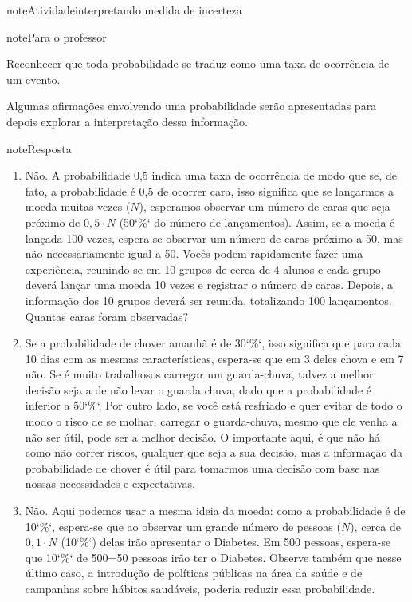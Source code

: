 \begin{sphinxadmonition}{note}{Atividade}{interpretando medida de incerteza}
\label{ativ-interpretando}

\begin{sphinxadmonition}{note}{Para o professor}

 Reconhecer que toda probabilidade se traduz como uma taxa de ocorrência de um evento.

 Algumas afirmações envolvendo uma probabilidade serão apresentadas para depois explorar a interpretação dessa informação.

\begin{sphinxadmonition}{note}{Resposta}

\begin{enumerate}
\item {} 
Não. A probabilidade 0,5 indica uma taxa de ocorrência de modo que se, de fato, a probabilidade é 0,5 de ocorrer cara, isso significa que se lançarmos a moeda muitas vezes (\(N\)), esperamos observar um número de caras que seja próximo de \(0,5\cdot N\) (50{}`\%{}` do número de lançamentos). Assim, se a moeda é lançada 100 vezes, espera-se observar um número de caras próximo a 50, mas não necessariamente igual a 50. Vocês podem rapidamente fazer uma experiência, reunindo-se em 10 grupos de cerca de 4 alunos e cada grupo deverá lançar uma moeda 10 vezes e registrar o número de caras. Depois, a informação dos 10 grupos deverá ser reunida, totalizando 100 lançamentos. Quantas caras foram observadas?

\item {} 
Se a probabilidade de chover amanhã é de 30{}`\%{}`, isso significa que para cada 10 dias com as mesmas características, espera-se que em 3 deles chova e em 7 não. Se é muito trabalhosos carregar um guarda-chuva, talvez a melhor decisão seja a de não levar o guarda chuva, dado que a probabilidade é inferior a 50{}`\%{}`. Por outro lado, se você está resfriado e quer evitar de todo o modo o risco de se molhar, carregar o guarda-chuva, mesmo que ele venha a não ser útil, pode ser a melhor decisão. O importante aqui, é que não há como não correr riscos, qualquer que seja a sua decisão, mas a informação da probabilidade de chover é útil para tomarmos uma decisão com base nas nossas necessidades e expectativas.

\item {} 
Não. Aqui podemos usar a mesma ideia da moeda: como a probabilidade é de 10{}`\%{}`, espera-se que ao observar um grande número de pessoas (\(N\)), cerca de \(0,1\cdot N\) (10{}`\%{}`) delas irão apresentar o Diabetes. Em 500 pessoas, espera-se que 10{}`\%{}` de 500=50 pessoas irão ter o Diabetes. Observe também que nesse último caso, a introdução de políticas públicas na área da saúde e de campanhas sobre hábitos saudáveis, poderia reduzir essa probabilidade.


\end{enumerate}
\end{sphinxadmonition}
\end{sphinxadmonition}
\end{sphinxadmonition}
